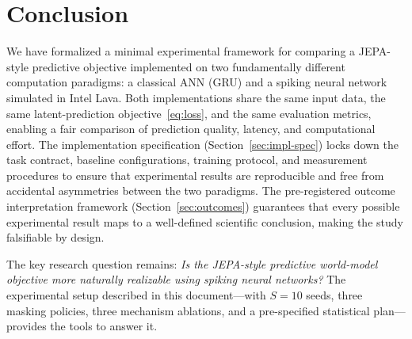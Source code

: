 \documentclass[11pt,a4paper]{article}
\begin{document}
\section{Conclusion}

We have formalized a minimal experimental framework for comparing a
JEPA-style predictive objective implemented on two fundamentally different
computation paradigms: a classical ANN (GRU) and a spiking neural network
simulated in Intel Lava.  Both implementations share the same input data,
the same latent-prediction objective~\eqref{eq:loss}, and the same
evaluation metrics, enabling a fair comparison of prediction quality,
latency, and computational effort.  The implementation
specification (Section~\ref{sec:impl-spec}) locks down the task
contract, baseline configurations, training protocol, and measurement
procedures to ensure that experimental results are reproducible and free
from accidental asymmetries between the two paradigms.
The pre-registered outcome interpretation framework
(Section~\ref{sec:outcomes}) guarantees that every possible experimental
result maps to a well-defined scientific conclusion, making the study
falsifiable by design.

The key research question remains: \emph{Is the JEPA-style predictive
world-model objective more naturally realizable using spiking neural
networks?}  The experimental setup described in this document---with
$S = 10$ seeds, three masking policies, three mechanism ablations, and
a pre-specified statistical plan---provides the tools to answer it.



\end{document}
